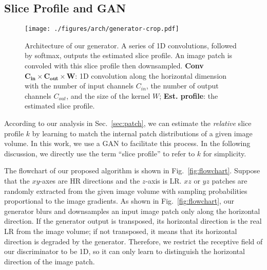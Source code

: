 \documentclass[runningheads]{llncs}
\begin{document}
\subsection{Slice Profile and GAN}

\begin{figure}[t]
    \centering
    \texttt{[image: ./figures/arch/generator-crop.pdf]}
    \caption{Architecture of our generator. A series of 1D
    convolutions, followed by softmax, outputs the estimated slice
    profile. An image patch is convoled with this slice profile then
    downsampled. \textbf{Conv} $\bm{C_{in} \times C_{out} \times W}$:
    1D convolution along the horizontal dimension with the number of
    input channels $C_{in}$, the number of output channels $C_{out}$,
    and the size of the kernel $W$; \textbf{Est. profile}: the
    estimated slice profile.}
    \label{fig:g}
\end{figure}
%
According to our analysis in Sec.~\ref{sec:patch}, we can estimate the
\textit{relative} slice profile $k$ by learning to match the internal
patch distributions of a given image volume. In this work, we use a
GAN to facilitate this process. In the following discussion,
we directly use the term ``slice profile'' to refer to $k$ for
simplicity.

The flowchart of our proposed algorithm is shown in
Fig.~\ref{fig:flowchart}. Suppose that the $xy$-axes are HR directions and
the $z$-axis is LR. $xz$ or $yz$ patches are randomly extracted from
the given image volume with sampling probabilities proportional to the
image gradients. As shown in Fig.~\ref{fig:flowchart}, our generator
blurs and downsamples an input image patch only along the horizontal
direction. If the generator output is transposed, its
horizontal direction is the real LR from the image volume; if not
transposed, it means that its horizontal direction is degraded by the
generator. Therefore, we restrict the receptive field of our
discriminator to be 1D, so it can only learn to distinguish the
horizontal direction of the image patch.
\end{document}
